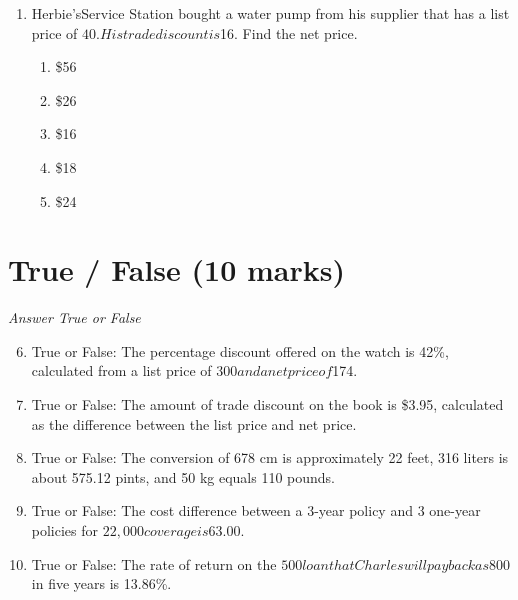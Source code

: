 \documentclass[12pt]{article}
\begin{document}
\begin{enumerate}[label=\arabic*.]
\begin{enumerate}[label=(\alph*)]
    \item equitably manage the sales bonus pool
    \item increase the competitiveness within the sales team
    \item create multiple points of contact between the customer and the company
    \item distribute the work involved in managing an account
    \item reduce the workload of individual salespeople
\end{enumerate}
\item Herbie'sService Station bought a water pump from his supplier that has a list price of $40. His trade discount is $16. Find the net price.
\begin{enumerate}[label=(\alph*)]
    \item \$56
    \item \$26
    \item \$16
    \item \$18
    \item \$24
\end{enumerate}
\end{enumerate}

\section*{True / False (10 marks)}
\textit{Answer True or False}
\begin{enumerate}[label=\arabic*.]
\setcounter{enumi}{5}
\item True or False: The percentage discount offered on the watch is 42\%, calculated from a list price of $300 and a net price of $174.
\item True or False: The amount of trade discount on the book is \$3.95, calculated as the difference between the list price and net price.
\item True or False: The conversion of 678 cm is approximately 22 feet, 316 liters is about 575.12 pints, and 50 kg equals 110 pounds.
\item True or False: The cost difference between a 3-year policy and 3 one-year policies for $22,000 coverage is $63.00.
\item True or False: The rate of return on the $500 loan that Charles will pay back as $800 in five years is 13.86\%.
\end{enumerate}
\end{document}

